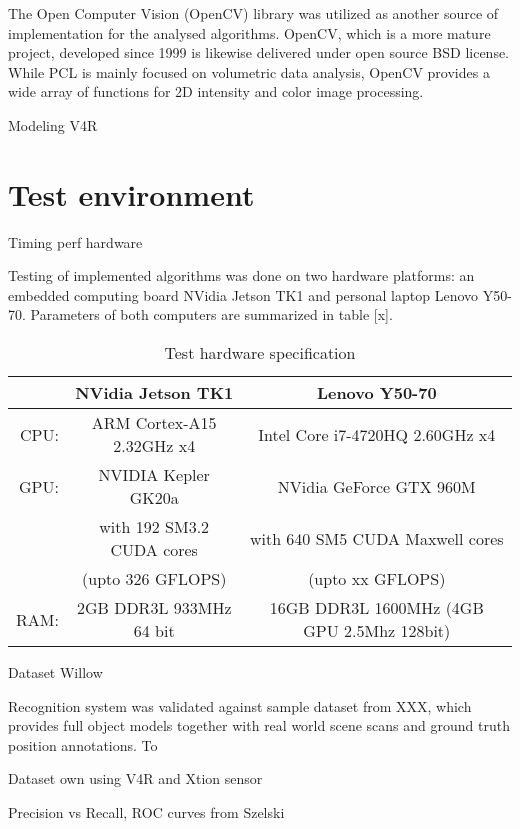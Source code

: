 The Open Computer Vision (OpenCV)\cite{OpenCV} library was utilized as another source of implementation for the analysed algorithms. OpenCV, which is a more mature project, developed since 1999 is likewise delivered under open source BSD license. While PCL is mainly focused on volumetric data analysis, OpenCV provides a wide array of functions for 2D intensity and color image processing.

Modeling \cite{modellingV4R}
V4R \cite{multiPipeline}


\section{Test environment}
\label{sec:testhardware}

Timing perf hardware

Testing of implemented algorithms was done on two hardware platforms: an embedded computing board NVidia Jetson TK1 and personal laptop Lenovo Y50-70. Parameters of both computers are summarized in table [x]. 

\begin{table}[H]
\centering
\begin{tabular}{r c | c}
& NVidia Jetson TK1 & Lenovo Y50-70 \\ 
 \hline
 CPU:& ARM Cortex-A15 2.32GHz x4 & Intel Core i7-4720HQ 2.60GHz x4\\
 GPU:& NVIDIA Kepler GK20a & NVidia GeForce GTX 960M \\
 &with 192 SM3.2 CUDA cores& with 640 SM5 CUDA Maxwell cores\\
 &(upto 326 GFLOPS)&(upto xx GFLOPS)\\
 RAM:& 2GB DDR3L 933MHz 64 bit&  16GB DDR3L 1600MHz (4GB GPU 2.5Mhz 128bit)
\end{tabular}
\caption{Test hardware specification}
\label{tab:hardware}
\end{table}

Dataset Willow

Recognition system was validated against sample dataset from XXX, which provides full object models together with real world scene scans and ground truth position annotations. To 


Dataset own using V4R and Xtion sensor

Precision vs Recall, ROC curves from Szelski

